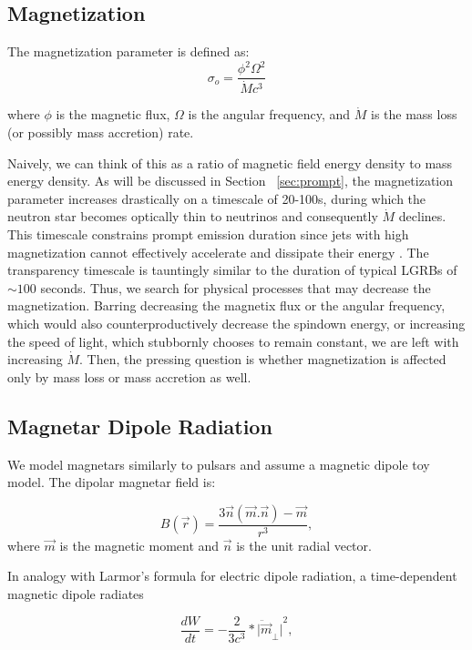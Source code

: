 \documentclass{article}
\begin{document}
\subsection{Magnetization} \label{sec:magnetization}

The magnetization parameter is defined as: 
\begin{equation}
\sigma_o= \frac{\phi^2 \Omega^2}{\dot{M} c^3}
\end{equation}

where $\phi$ is the magnetic flux, $\Omega$ is the angular frequency, and $\dot{M}$ is the mass loss (or possibly mass accretion) rate.

Naively, we can think of this as a ratio of magnetic field energy density to mass energy density. As will be discussed in Section ~\ref{sec:prompt}, the magnetization parameter increases drastically on a timescale of 20-100s, during which the neutron star becomes optically thin to neutrinos and consequently $\dot{M}$ declines. This timescale constrains prompt emission duration since jets with high magnetization cannot effectively accelerate and dissipate their energy \cite{Metzger:2010pp}. The transparency timescale is tauntingly similar to the duration of typical LGRBs of $\sim 100$ seconds. Thus, we search for physical processes that may decrease the magnetization. Barring decreasing the magnetix flux or the angular frequency, which would also counterproductively decrease the spindown energy, or increasing the speed of light, which stubbornly chooses to remain constant,  we are left with increasing $\dot{M}$. Then, the pressing question is whether magnetization is affected only by mass loss or mass accretion as well.

\subsection{Magnetar Dipole Radiation} \label{sec:dipole}

We model magnetars similarly to pulsars and assume a magnetic dipole toy model. The dipolar magnetar field is:

\begin{equation} B(\vec{r})=\frac{3\vec{n}(\vec{m}.\vec{n})-\vec{m}}{r^3}, \end{equation}
where $\vec{m}$ is the magnetic moment and $\vec{n}$ is the unit radial vector.

In analogy with Larmor's formula for electric dipole radiation, a time-dependent magnetic dipole radiates

\begin{equation}
\frac{dW}{dt} = -\frac{2}{3c^3} *{\ddot{|\vec{m}}_\perp|}^2,
\end{equation}
\end{document}
